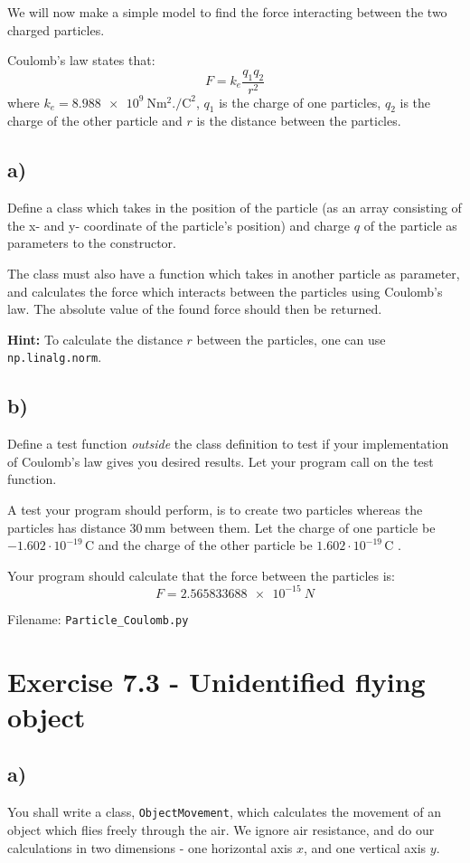\documentclass[10pt,a4paper]{article}
\begin{document}
We will now make a simple model to find the force interacting between the two charged particles. 

Coulomb's law states that:
\[
F = k_e\frac{q_1q_2}{r^2}
\]
where $k_e = \SI{8.988e9}{\newton\square\meter.\per\square\coulomb}$, $q_1$ is the charge of one particles, $q_2$ is the charge of the other particle and $r$ is the distance between the particles. 
\subsection*{a)}
Define a class which takes in the position of the particle (as an array consisting of the x- and y- coordinate of the particle's position) and charge $q$ of the particle as parameters to the constructor. 

The class must also have a function which takes in another particle as parameter, and calculates the force which interacts between the particles using Coulomb's law. The absolute value of the found force should then be returned. 

\textbf{Hint:} To calculate the distance $r$ between the particles, one can use \texttt{np.linalg.norm}. 
\subsection*{b)}
Define a test function \textit{outside} the class definition to test if your implementation of Coulomb's law gives you desired results. Let your program call on the test function. 

A test your program should perform, is to create two particles whereas  the particles has distance $30 \,\si{\milli\meter}$ between them. Let the charge of one particle be $-1.602\cdot10^{-19}\,\si{\coulomb}$ and the charge of the other particle be $1.602\cdot10^{-19}\,\si{\coulomb}$ . 

Your program should calculate that the force between the particles is:
\[
F = \SI{2.565833688e-15}{N}
\]

Filename: \texttt{Particle\_Coulomb.py}



\section*{Exercise 7.3 - Unidentified flying object}

\subsection*{a)}
You shall write a class, \texttt{ObjectMovement}, which calculates the movement of an object which flies freely through the air. We ignore air resistance, and do our calculations in two dimensions - one horizontal axis $x$, and one vertical axis $y$.
\end{document}
